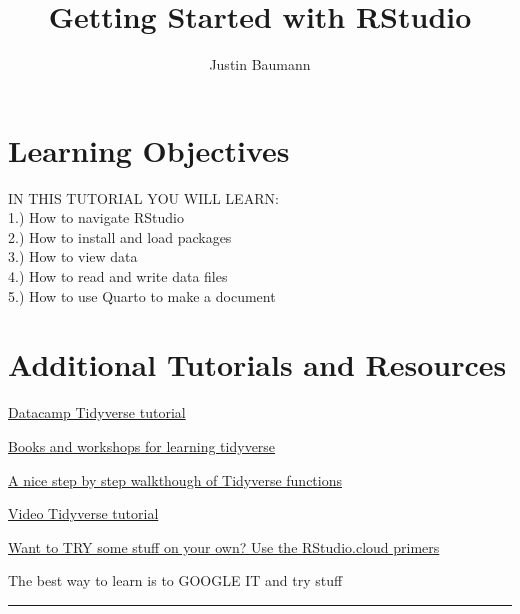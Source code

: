 \documentclass[
  letterpaper,
  DIV=11,
  numbers=noendperiod]{scrartcl}
\title{Getting Started with RStudio}
\author{Justin Baumann}
\date{}
\renewcommand*\contentsname{Table of contents}
\newcommand\contentsname{Table of contents}
\begin{document}
\maketitle
\ifdefined\Shaded\renewenvironment{Shaded}{\begin{tcolorbox}[frame hidden, borderline west={3pt}{0pt}{shadecolor}, breakable, interior hidden, enhanced, boxrule=0pt, sharp corners]}{\end{tcolorbox}}\fi

\renewcommand*\contentsname{Table of contents}
{
\hypersetup{linkcolor=}
\setcounter{tocdepth}{3}
\tableofcontents
}
\hypertarget{learning-objectives}{%
\section{\texorpdfstring{\textbf{Learning
Objectives}}{Learning Objectives}}\label{learning-objectives}}

IN THIS TUTORIAL YOU WILL LEARN:\\
1.) How to navigate RStudio\\
2.) How to install and load packages\\
3.) How to view data\\
4.) How to read and write data files\\
5.) How to use Quarto to make a document

\hypertarget{additional-tutorials-and-resources}{%
\section{Additional Tutorials and
Resources}\label{additional-tutorials-and-resources}}

\href{https://www.datacamp.com/community/tutorials/tidyverse-tutorial-r}{Datacamp
Tidyverse tutorial}

\href{https://www.tidyverse.org/learn/}{Books and workshops for learning
tidyverse}

\href{https://and.netlify.app/tutorials/02/}{A nice step by step
walkthough of Tidyverse functions}

\href{https://www.youtube.com/watch?v=JtQfXY0lIzc}{Video Tidyverse
tutorial}

\href{https://rstudio.cloud/learn/primers}{Want to TRY some stuff on
your own? Use the RStudio.cloud primers}

The best way to learn is to GOOGLE IT and try stuff

\begin{center}\rule{0.5\linewidth}{0.5pt}\end{center}
\end{document}
